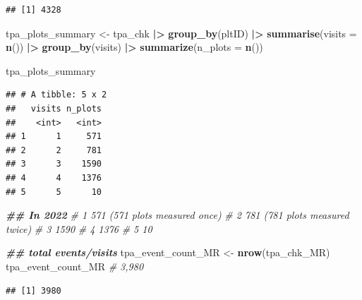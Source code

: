 \documentclass[
]{book}
\newenvironment{Shaded}{\begin{snugshade}}{\end{snugshade}}
\newcommand{\AttributeTok}[1]{\textcolor[rgb]{0.13,0.29,0.53}{#1}}
\newcommand{\CommentTok}[1]{\textcolor[rgb]{0.56,0.35,0.01}{\textit{#1}}}
\newcommand{\DocumentationTok}[1]{\textcolor[rgb]{0.56,0.35,0.01}{\textbf{\textit{#1}}}}
\newcommand{\FunctionTok}[1]{\textcolor[rgb]{0.13,0.29,0.53}{\textbf{#1}}}
\newcommand{\NormalTok}[1]{#1}
\newcommand{\OtherTok}[1]{\textcolor[rgb]{0.56,0.35,0.01}{#1}}
\newcommand{\SpecialCharTok}[1]{\textcolor[rgb]{0.81,0.36,0.00}{\textbf{#1}}}
\begin{document}
\begin{verbatim}
## [1] 4328
\end{verbatim}

\begin{Shaded}
\begin{Highlighting}[]
\NormalTok{tpa\_plots\_summary }\OtherTok{\textless{}{-}}\NormalTok{ tpa\_chk }\SpecialCharTok{|\textgreater{}}
  \FunctionTok{group\_by}\NormalTok{(pltID) }\SpecialCharTok{|\textgreater{}}
  \FunctionTok{summarise}\NormalTok{(}\AttributeTok{visits =} \FunctionTok{n}\NormalTok{()) }\SpecialCharTok{|\textgreater{}}
  \FunctionTok{group\_by}\NormalTok{(visits) }\SpecialCharTok{|\textgreater{}}
  \FunctionTok{summarize}\NormalTok{(}\AttributeTok{n\_plots =} \FunctionTok{n}\NormalTok{())}

\NormalTok{tpa\_plots\_summary}
\end{Highlighting}
\end{Shaded}

\begin{verbatim}
## # A tibble: 5 x 2
##   visits n_plots
##    <int>   <int>
## 1      1     571
## 2      2     781
## 3      3    1590
## 4      4    1376
## 5      5      10
\end{verbatim}

\begin{Shaded}
\begin{Highlighting}[]
\DocumentationTok{\#\# In 2022 }
\CommentTok{\#      1     571 (571 plots measured once)}
\CommentTok{\#      2     781 (781 plots measured twice)}
\CommentTok{\#      3    1590}
\CommentTok{\#      4    1376}
\CommentTok{\#      5      10}

\DocumentationTok{\#\# total events/visits}
\NormalTok{tpa\_event\_count\_MR }\OtherTok{\textless{}{-}} \FunctionTok{nrow}\NormalTok{(tpa\_chk\_MR) }
\NormalTok{tpa\_event\_count\_MR }\CommentTok{\# 3,980}
\end{Highlighting}
\end{Shaded}

\begin{verbatim}
## [1] 3980
\end{verbatim}

\begin{Shaded}
\end{Shaded}
\end{document}
